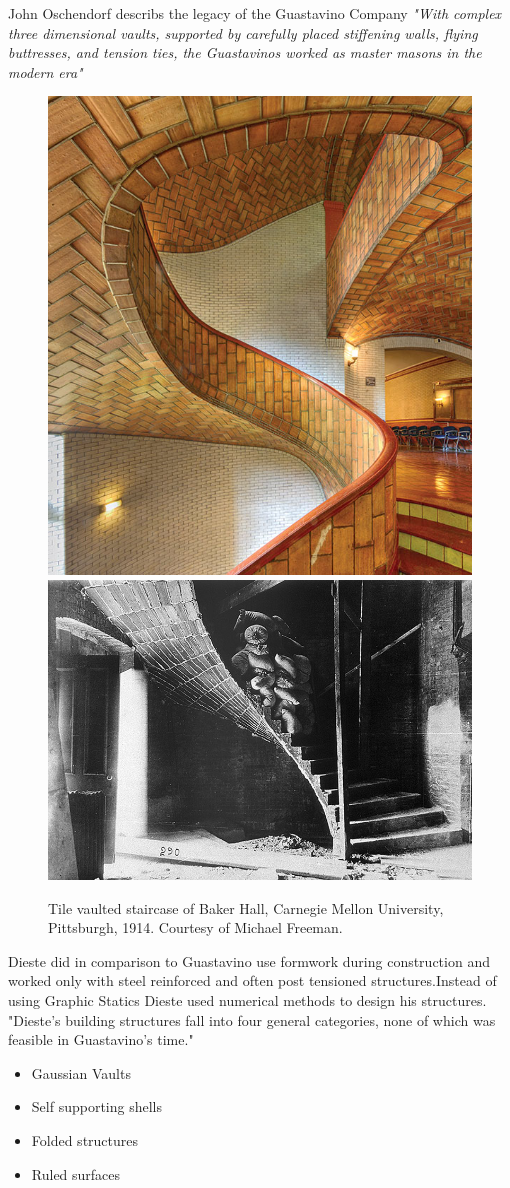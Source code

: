  John Oschendorf describs the legacy of the Guastavino Company \textit{"With complex three dimensional vaults, supported by carefully placed stiffening walls, flying buttresses, and tension ties, the Guastavinos worked as master masons in the modern era"} 

\begin{figure}[H]
\centering
\includegraphics[height=0.4\linewidth ]{figure/Introduction/GuastovinoStair.jpg}
\includegraphics[height=0.4\linewidth ]{figure/Introduction/GuastavinoStair2.jpg}
\caption{Tile vaulted staircase of Baker Hall, Carnegie Mellon University, Pittsburgh, 1914. Courtesy of Michael Freeman.}
\end{figure}

Dieste did in comparison to Guastavino use formwork during construction and worked only with steel reinforced and often post tensioned structures.Instead of using Graphic Statics Dieste used numerical methods to design his structures. "Dieste’s building structures fall into four general categories, none of which was feasible in Guastavino’s time."

\begin{itemize}

\item Gaussian Vaults
\item Self supporting shells
\item Folded structures
\item Ruled surfaces
\end{itemize}


